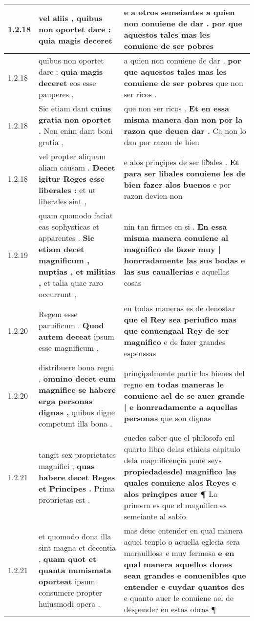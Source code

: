 \begin{tabular}{|p{1cm}|p{6.5cm}|p{6.5cm}|}
1.2.18 & vel aliis , \textbf{ quibus non oportet dare : } quia magis deceret & e a otros semeiantes \textbf{ a quien non conuiene de dar . } por que aquestos tales mas les conuiene de ser pobres \\\hline
1.2.18 & quibus non oportet dare : \textbf{ quia magis deceret } eos esse pauperes , & a quien non conuiene de dar . \textbf{ por que aquestos tales mas les conuiene de ser pobres } que non ser ricos . \\\hline
1.2.18 & Sic etiam dant \textbf{ cuius gratia non oportet . } Non enim dant boni gratia , & que non ser ricos . \textbf{ Et en essa misma manera dan non por la razon que deuen dar . } Ca non lo dan por razon de bien \\\hline
1.2.18 & vel propter aliquam aliam causam . \textbf{ Decet igitur Reges esse liberales : } et ut liberales sint , & e alos prinçipes de ser liƀͣales . \textbf{ Et para ser libales conuiene les de bien fazer alos buenos } e por razon devien non \\\hline
1.2.19 & quam quomodo faciat eas sophysticas et apparentes . \textbf{ Sic etiam decet magnificum , nuptias , et militias , } et talia quae raro occurrunt , & nin tan firmes en si . \textbf{ En essa misma manera conuiene al magnifico de fazer muy | honrradamente las sus bodas e las sus cauallerias } e aquellas cosas \\\hline
1.2.20 & Regem esse paruificum . \textbf{ Quod autem deceat } ipsum esse magnificum , & en todas maneras es de denostar \textbf{ que el Rey sea periufico mas que conuengaal Rey de ser magnifico } e de fazer grandes espenssas \\\hline
1.2.20 & distribuere bona regni , \textbf{ omnino decet eum magnifice se habere erga personas dignas , } quibus digne competunt illa bona . & prinçipalmente partir los bienes del regno \textbf{ en todas maneras le conuiene ael de se auer grande | e honrradamente a aquellas personas } que son dignas \\\hline
1.2.21 & tangit sex proprietates magnifici , \textbf{ quas habere decet Reges et Principes . } Prima proprietas est , & euedes saber que el philosofo enl quarto libro delas ethicas capitulo dela magnificençia pone seys \textbf{ propiedadesdel magnifico las quales conuiene alos Reyes e alos prinçipes auer ¶ } La primera es que el magnifico es semeiante al sabio \\\hline
1.2.21 & et quomodo dona illa sint magna et decentia , \textbf{ quam quot et quanta numismata oporteat } ipsum consumere propter huiusmodi opera . & mas deue entender en qual manera aquel tenplo o aquella eglesia sera marauillosa e muy fermosa \textbf{ e en qual manera aquellos dones sean grandes e conuenibles que entender e cuydar quantos des } e quanto auer le conuiene ael de despender en estas obras ¶ \\\hline

\end{tabular}
